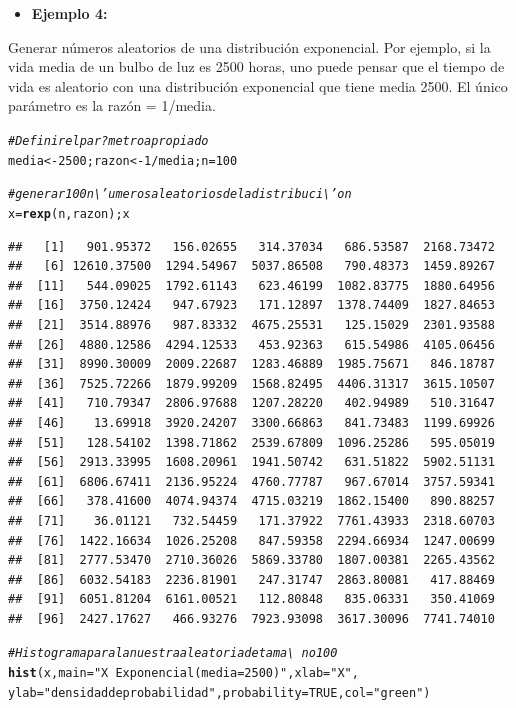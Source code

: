 \documentclass[12pt,letterpaper]{article}\usepackage[]{graphicx}\usepackage[]{color}
\makeatletter
\newcommand{\hlnum}[1]{\textcolor[rgb]{0.686,0.059,0.569}{#1}}%
\newcommand{\hlstr}[1]{\textcolor[rgb]{0.192,0.494,0.8}{#1}}%
\newcommand{\hlcom}[1]{\textcolor[rgb]{0.678,0.584,0.686}{\textit{#1}}}%
\newcommand{\hlopt}[1]{\textcolor[rgb]{0,0,0}{#1}}%
\newcommand{\hlstd}[1]{\textcolor[rgb]{0.345,0.345,0.345}{#1}}%
\newcommand{\hlkwb}[1]{\textcolor[rgb]{0.69,0.353,0.396}{#1}}%
\newcommand{\hlkwc}[1]{\textcolor[rgb]{0.333,0.667,0.333}{#1}}%
\newcommand{\hlkwd}[1]{\textcolor[rgb]{0.737,0.353,0.396}{\textbf{#1}}}%
\newenvironment{kframe}{%
 \def\at@end@of@kframe{}%
 \ifinner\ifhmode%
  \def\at@end@of@kframe{\end{minipage}}%
  \begin{minipage}{\columnwidth}%
 \fi\fi%
 \def\FrameCommand##1{\hskip\@totalleftmargin \hskip-\fboxsep
 \colorbox{shadecolor}{##1}\hskip-\fboxsep
     \hskip-\linewidth \hskip-\@totalleftmargin \hskip\columnwidth}%
 \MakeFramed {\advance\hsize-\width
   \@totalleftmargin\z@ \linewidth\hsize
   \@setminipage}}%
 {\par\unskip\endMakeFramed%
 \at@end@of@kframe}
\newenvironment{knitrout}{}{} %
\makeatother
\begin{document}
\begin{itemize}
  \item \textbf{Ejemplo 4:}
\end{itemize}
Generar n\'umeros aleatorios de una distribuci\'on exponencial. Por ejemplo, si la vida media de un bulbo de luz es 2500 horas, uno puede pensar que el tiempo de vida es aleatorio con una distribuci\'on exponencial que tiene media 2500. El \'unico par\'ametro es la raz\'on = 1/media.
\begin{knitrout}
\color{fgcolor}\begin{kframe}
\begin{alltt}
\hlcom{# Definir el par?metro apropiado }
\hlstd{media} \hlkwb{<-} \hlnum{2500}\hlstd{; razon} \hlkwb{<-} \hlnum{1}\hlopt{/}\hlstd{media;n}\hlkwb{=}\hlnum{100}

\hlcom{# generar 100 n\textbackslash{}'umeros aleatorios de la distribuci\textbackslash{}'on }
\hlstd{x} \hlkwb{=} \hlkwd{rexp}\hlstd{(n, razon); x}
\end{alltt}
\begin{verbatim}
##   [1]   901.95372   156.02655   314.37034   686.53587  2168.73472
##   [6] 12610.37500  1294.54967  5037.86508   790.48373  1459.89267
##  [11]   544.09025  1792.61143   623.46199  1082.83775  1880.64956
##  [16]  3750.12424   947.67923   171.12897  1378.74409  1827.84653
##  [21]  3514.88976   987.83332  4675.25531   125.15029  2301.93588
##  [26]  4880.12586  4294.12533   453.92363   615.54986  4105.06456
##  [31]  8990.30009  2009.22687  1283.46889  1985.75671   846.18787
##  [36]  7525.72266  1879.99209  1568.82495  4406.31317  3615.10507
##  [41]   710.79347  2806.97688  1207.28220   402.94989   510.31647
##  [46]    13.69918  3920.24207  3300.66863   841.73483  1199.69926
##  [51]   128.54102  1398.71862  2539.67809  1096.25286   595.05019
##  [56]  2913.33995  1608.20961  1941.50742   631.51822  5902.51131
##  [61]  6806.67411  2136.95224  4760.77787   967.67014  3757.59341
##  [66]   378.41600  4074.94374  4715.03219  1862.15400   890.88257
##  [71]    36.01121   732.54459   171.37922  7761.43933  2318.60703
##  [76]  1422.16634  1026.25208   847.59358  2294.66934  1247.00699
##  [81]  2777.53470  2710.36026  5869.33780  1807.00381  2265.43562
##  [86]  6032.54183  2236.81901   247.31747  2863.80081   417.88469
##  [91]  6051.81204  6161.00521   112.80848   835.06331   350.41069
##  [96]  2427.17627   466.93276  7923.93098  3617.30096  7741.74010
\end{verbatim}
\begin{alltt}
\hlcom{# Histograma para la nuestra aleatoria de tama\textbackslash{}~no 100 }
\hlkwd{hist}\hlstd{(x,} \hlkwc{main}\hlstd{=}\hlstr{"X ~ Exponencial( media = 2500 )"}\hlstd{,} \hlkwc{xlab}\hlstd{=}\hlstr{"X"}\hlstd{,}
     \hlkwc{ylab}\hlstd{=}\hlstr{"densidad de probabilidad"}\hlstd{,} \hlkwc{probability}\hlstd{=}\hlnum{TRUE}\hlstd{,} \hlkwc{col}\hlstd{=}\hlstr{"green"}\hlstd{)}


\end{alltt}
\end{kframe}
\end{knitrout}
\end{document}
